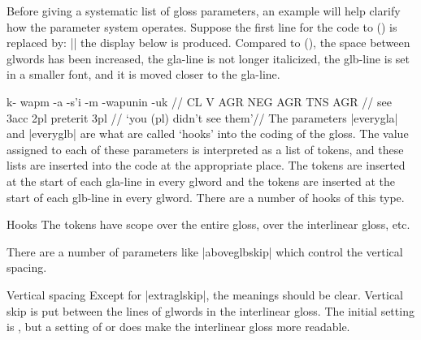 Before giving a systematic list of gloss parameters, an example
will help clarify how the parameter system operates.  Suppose the
first line for the code to () is replaced by:
\medskip
\noindent |\ex[glspace=1.5em,everygla={},everyglb=\footnotesize,aboveglbskip=-.2ex]|
\medskip
\noindent the display below is produced.  Compared to
(), the space between glwords has been increased, the
gla-line is not longer italicized, the glb-line is set in
a smaller font, and it is moved closer to the gla-line.

\framedisplay
{}
\begingl
\gla k- wapm -a -s'i -m -wapunin -uk //
\glb CL V AGR NEG AGR TNS AGR //
 see {\sc 3acc} {} {\sc 2pl} preterit {\sc 3pl} //
\glft `you (pl) didn't see them'//
\endgl
\xe
\endframedisplay
The parameters |everygla| and |everyglb| are what are called `hooks'
into the coding of the gloss.  The value assigned to each of these
parameters is interpreted as a list of tokens, and these lists are
inserted into the code at the appropriate place.  The tokens
 are inserted at the start of each gla-line in
every glword and the tokens  are inserted at the
start of each glb-line in every glword.  There are a number of hooks
of this type.

\ex[dima=2em] Hooks
\smallskip
\quad
{}\xe
The tokens  have scope over the entire gloss,
 over the interlinear gloss, etc.

There are a number of parameters like |aboveglbskip| which control the
vertical spacing.

\ex[dima=2em] Vertical spacing
\smallskip
\quad
{}\xe
Except for |extraglskip|, the meanings should be clear.
Vertical skip  is put between the lines of
glwords in the interlinear gloss.  The initial setting is \textdim{0
pt}, but a setting of \textdim{.5 ex} or \textdim{1 ex} does make the
interlinear gloss more readable.

